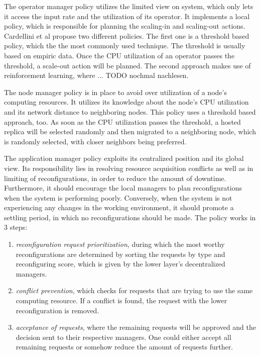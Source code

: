         \quad The operator manager policy utilizes the limited view on system, which only lets it access the input rate and the utilization of its operator.
        It implements a local policy, which is responsible for planning the scaling-in and scaling-out actions. Cardellini et al propose two different policies.
        The first one is a threshold based policy, which the the most commonly used technique. The threshold is usually based on empiric data. Once the CPU utilization 
        of an operator passes the threshold, a scale-out action will be planned. 
        The second approach makes use of reinforcement learning, where ... {TODO nochmal nachlesen}.

        \quad The node manager policy is in place to avoid over utilization of a node's computing resources. 
        It utilizes its knowledge about the node's CPU utilization and its network distance to neighboring nodes.
        This policy uses a threshold based approach, too. As soon as the CPU utilization passes the threshold, a hosted replica will be selected 
        randomly and then migrated to a neighboring node, which is randomly selected, with closer neighbors being preferred. 

        \quad The application manager policy exploits its centralized position and its global view. 
        Its responsibility lies in resolving resource acquisition conflicts as well as in limiting of reconfigurations, 
        in order to reduce the amount of downtime. Furthermore, it should encourage the local managers to plan reconfigurations when the system 
        is performing poorly. Conversely, when the system is not experiencing any changes in the working environment, it should promote a settling period, 
        in which no reconfigurations should be made.
        The policy works in 3 steps:

        \begin{enumerate}
            \item \textit{reconfiguration request prioritization}, during which the most worthy reconfigurations are determined by sorting the requests 
            by type and reconfiguring score, which is given by the lower layer's decentralized managers. 
            \item \textit{conflict prevention}, which checks for requests that are trying to use the same computing resource. If a conflict is found, the 
            request with the lower reconfiguration is removed.
            \item \textit{acceptance of requests}, where the remaining requests will be approved and the decision sent to their respective managers. 
            One could either accept all remaining requests or somehow reduce the amount of requests further.
        \end{enumerate}



